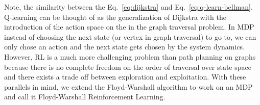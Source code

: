 Note, the similarity between the Eq.~\eqref{eq:dijkstra} and
Eq.~\eqref{eq:q-learn-bellman}. Q-learning can be thought of as the
generalization of Dijkstra with the introduction of the action space on the in
the graph traversal problem. In MDP instead of choosing the next state (or
vertex in graph traversal) to go to, we can only chose an action and the next
state gets chosen by the system dynamics.
However, RL is a much more challenging problem than path planning on graphs
because there is no complete freedom on the order of traversal over state space
and there exists a trade off between exploration and exploitation. With these
parallels in mind, we extend the Floyd-Warshall algorithm to work on an MDP and
call it Floyd-Warshall Reinforcement Learning.

